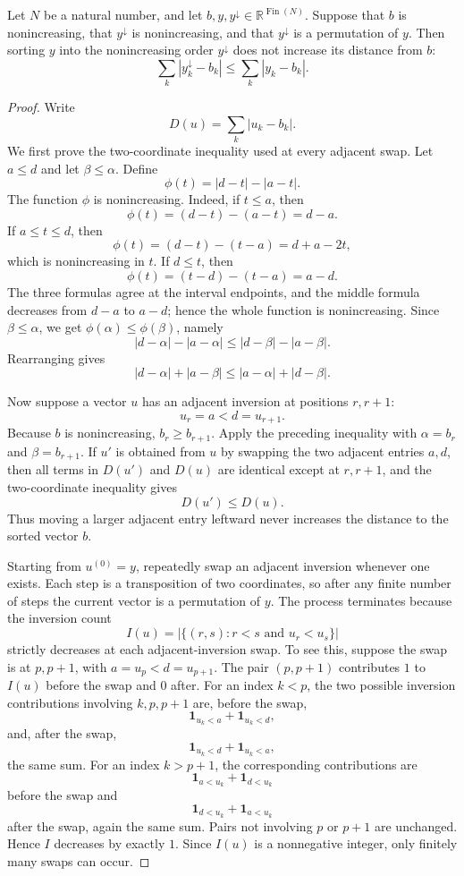 \begin{helper}
Let \(N\) be a natural number, and let
\(b,y,y^\downarrow\in\mathbb R^{\operatorname{Fin}(N)}\).  Suppose that
\(b\) is nonincreasing, that \(y^\downarrow\) is nonincreasing, and that
\(y^\downarrow\) is a permutation of \(y\).  Then sorting \(y\) into the
nonincreasing order \(y^\downarrow\) does not increase its distance from
\(b\):
\[
\sum_k |y^\downarrow_k-b_k|\le \sum_k |y_k-b_k|.
\]
\end{helper}
\begin{proof}
Write
\[
D(u)=\sum_k |u_k-b_k|.
\]
We first prove the two-coordinate inequality used at every adjacent swap.
Let \(a\le d\) and let \(\beta\le\alpha\).  Define
\[
\phi(t)=|d-t|-|a-t|.
\]
The function \(\phi\) is nonincreasing.  Indeed, if \(t\le a\), then
\[
\phi(t)=(d-t)-(a-t)=d-a.
\]
If \(a\le t\le d\), then
\[
\phi(t)=(d-t)-(t-a)=d+a-2t,
\]
which is nonincreasing in \(t\).  If \(d\le t\), then
\[
\phi(t)=(t-d)-(t-a)=a-d.
\]
The three formulas agree at the interval endpoints, and the middle formula
decreases from \(d-a\) to \(a-d\); hence the whole function is
nonincreasing.  Since \(\beta\le\alpha\), we get
\(\phi(\alpha)\le\phi(\beta)\), namely
\[
|d-\alpha|-|a-\alpha|
\le
|d-\beta|-|a-\beta|.
\]
Rearranging gives
\[
|d-\alpha|+|a-\beta|\le |a-\alpha|+|d-\beta|.
\]

Now suppose a vector \(u\) has an adjacent inversion at positions \(r,r+1\):
\[
u_r=a<d=u_{r+1}.
\]
Because \(b\) is nonincreasing, \(b_r\ge b_{r+1}\).  Apply the preceding
inequality with \(\alpha=b_r\) and \(\beta=b_{r+1}\).  If \(u'\) is obtained
from \(u\) by swapping the two adjacent entries \(a,d\), then all terms in
\(D(u')\) and \(D(u)\) are identical except at \(r,r+1\), and the
two-coordinate inequality gives
\[
D(u')\le D(u).
\]
Thus moving a larger adjacent entry leftward never increases the distance to
the sorted vector \(b\).

Starting from \(u^{(0)}=y\), repeatedly swap an adjacent inversion whenever
one exists.  Each step is a transposition of two coordinates, so after any
finite number of steps the current vector is a permutation of \(y\).  The
process terminates because the inversion count
\[
I(u)=|\{(r,s): r<s\text{ and }u_r<u_s\}|
\]
strictly decreases at each adjacent-inversion swap.  To see this, suppose
the swap is at \(p,p+1\), with \(a=u_p<d=u_{p+1}\).  The pair
\((p,p+1)\) contributes \(1\) to \(I(u)\) before the swap and \(0\) after.
For an index \(k<p\), the two possible inversion contributions involving
\(k,p,p+1\) are, before the swap,
\[
\mathbf 1_{u_k<a}+\mathbf 1_{u_k<d},
\]
and, after the swap,
\[
\mathbf 1_{u_k<d}+\mathbf 1_{u_k<a},
\]
the same sum.  For an index \(k>p+1\), the corresponding contributions are
\[
\mathbf 1_{a<u_k}+\mathbf 1_{d<u_k}
\]
before the swap and
\[
\mathbf 1_{d<u_k}+\mathbf 1_{a<u_k}
\]
after the swap, again the same sum.  Pairs not involving \(p\) or \(p+1\)
are unchanged.  Hence \(I\) decreases by exactly \(1\).  Since \(I(u)\) is a
nonnegative integer, only finitely many swaps can occur.


\end{proof}
